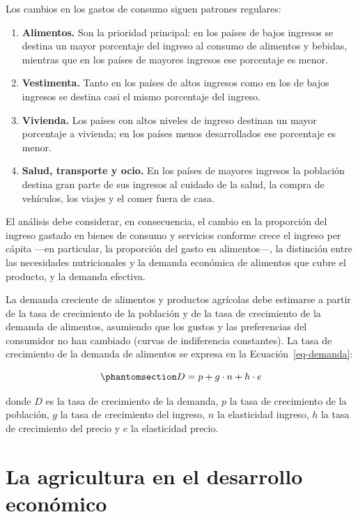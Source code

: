 \documentclass[
  man,
  floatsintext,
  longtable,
  a4paper,
  nolmodern,
  notxfonts,
  notimes,
  12pt,
  colorlinks=true,linkcolor=blue,citecolor=blue,urlcolor=blue]{apa7}
\begin{document}
Los cambios en los gastos de consumo siguen patrones regulares:

\begin{enumerate}
\def\labelenumi{\arabic{enumi}.}
\item
  \textbf{Alimentos.} Son la prioridad principal: en los países de bajos
  ingresos se destina un mayor porcentaje del ingreso al consumo de
  alimentos y bebidas, mientras que en los países de mayores ingresos
  ese porcentaje es menor.
\item
  \textbf{Vestimenta.} Tanto en los países de altos ingresos como en los
  de bajos ingresos se destina casi el mismo porcentaje del ingreso.
\item
  \textbf{Vivienda.} Los países con altos niveles de ingreso destinan un
  mayor porcentaje a vivienda; en los países menos desarrollados ese
  porcentaje es menor.
\item
  \textbf{Salud, transporte y ocio.} En los países de mayores ingresos
  la población destina gran parte de sus ingresos al cuidado de la
  salud, la compra de vehículos, los viajes y el comer fuera de casa.
\end{enumerate}

El análisis debe considerar, en consecuencia, el cambio en la proporción
del ingreso gastado en bienes de consumo y servicios conforme crece el
ingreso per cápita ---en particular, la proporción del gasto en
alimentos---, la distinción entre las necesidades nutricionales y la
demanda económica de alimentos que cubre el producto, y la demanda
efectiva.

La demanda creciente de alimentos y productos agrícolas debe estimarse a
partir de la tasa de crecimiento de la población y de la tasa de
crecimiento de la demanda de alimentos, asumiendo que los gustos y las
preferencias del consumidor no han cambiado (curvas de indiferencia
constantes). La tasa de crecimiento de la demanda de alimentos se
expresa en la Ecuación~\ref{eq-demanda}:

\begin{equation}\protect\phantomsection\label{eq-demanda}{
D = p + g \cdot n + h \cdot e
}\end{equation}

donde \(D\) es la tasa de crecimiento de la demanda, \(p\) la tasa de
crecimiento de la población, \(g\) la tasa de crecimiento del ingreso,
\(n\) la elasticidad ingreso, \(h\) la tasa de crecimiento del precio y
\(e\) la elasticidad precio.

\section{La agricultura en el desarrollo
económico}\label{la-agricultura-en-el-desarrollo-econuxf3mico}
\end{document}
